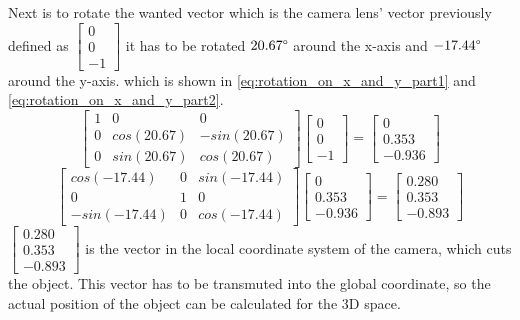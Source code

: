 Next is to rotate the wanted vector which is the camera lens' vector previously defined as
$\left[\!\begin{array}{c}
0\\
0\\
-1
\end{array}\!\right] $
 it has to be rotated $20.67\degree$ around the x-axis and $-17.44\degree$ around the y-axis. which is shown in \cref{eq:rotation_on_x_and_y_part1} and \cref{eq:rotation_on_x_and_y_part2}.
\begin{equation}\label{eq:rotation_on_x_and_y_part1}
\begin{bmatrix}
1 & 0 & 0 \\
0 & cos(20.67) & -sin(20.67) \\
0 & sin(20.67) & cos(20.67)
\end{bmatrix}
\begin{bmatrix}
0 \\
0 \\
-1
\end{bmatrix}
=
 \begin{bmatrix}
0 \\
0.353\\
-0.936
\end{bmatrix}
\end{equation}
\begin{equation}\label{eq:rotation_on_x_and_y_part2}
\begin{bmatrix}
cos(-17.44)  & 0 & sin(-17.44) \\
0 & 1 & 0 \\
-sin(-17.44) & 0 & cos(-17.44)
\end{bmatrix}
\begin{bmatrix}
0 \\
0.353\\
-0.936
\end{bmatrix}
=
 \begin{bmatrix}
0.280 \\
0.353 \\
-0.893
\end{bmatrix}
\end{equation}
$\left[\!\begin{array}{c}
0.280 \\
0.353 \\
-0.893
\end{array}\!\right] $
is the vector in the local coordinate system of the camera, which cuts the object. This vector has to be transmuted into the global coordinate, so the actual position of the object can be calculated for the 3D space.
